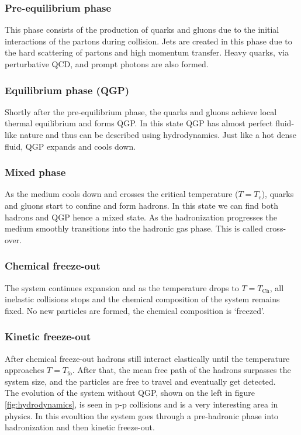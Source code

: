 \documentclass[12pt,a4paper,twoside]{report}
\begin{document}
\subsubsection{Pre-equilibrium phase}
This phase consists of the production of quarks and gluons due to the initial interactions of the partons during collision. Jets are created in this phase due to the hard scattering of partons and high momentum transfer. Heavy quarks, via perturbative QCD, and prompt photons are also formed.
\subsubsection{Equilibrium phase (QGP)}
Shortly after the pre-equilibrium phase, the quarks and gluons achieve local thermal equilibrium and forms QGP. In this state QGP has almost perfect fluid-like nature and thus can be described using hydrodynamics. Just like a hot dense fluid, QGP expands and cools down.
\subsubsection{Mixed phase}
As the medium cools down and crosses the critical temperature  ($T=T_\mathrm{c}$), quarks and gluons start to confine and form hadrons. In this state we can find both hadrons and QGP hence a mixed state. As the hadronization progresses the medium smoothly transitions into the hadronic gas phase. This is called cross-over.
\subsubsection{Chemical freeze-out}
The system continues expansion and as the temperature drops to $T=T_\mathrm{Ch}$, all inelastic collisions stops and the chemical composition of the system remains fixed. No new particles are formed, the chemical composition is `freezed'.
\subsubsection{Kinetic freeze-out}
After chemical freeze-out hadrons still interact elastically until the temperature approaches $T=T_\mathrm{fo}$. After that, the mean free path of the hadrons surpasses the system size, and the particles are free to travel and eventually get detected.\\

The evolution of the system without QGP, shown on the left in figure \ref{fig:hydrodynamics}, is seen in p-p collisions and is a very interesting area in physics. In this evoultion the system goes through a pre-hadronic phase into hadronization and then kinetic freeze-out.
\end{document}
